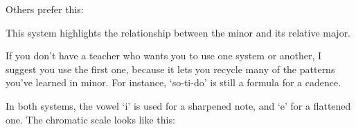 \documentclass{sight}
\begin{document}
\pagebreak[3]\par
\vspace{5mm}\begin{samepage}Others prefer this:\\


\pagebreak[3]\par
\par
{%
\parindent 0pt
\noindent
\ifx\preLilyPondExample \undefined
\else
  \expandafter\preLilyPondExample
\fi
\def\lilypondbook{}%

\ifx\postLilyPondExample \undefined
\else
  \expandafter\postLilyPondExample
\fi
}
\end{samepage}


\pagebreak[3]\par
\vspace{5mm}\begin{samepage}This system highlights the relationship between the minor and its relative major.\\
\end{samepage}


\pagebreak[3]\par
\vspace{5mm}\begin{samepage}If you don't have a teacher who wants you to use one system or another, I suggest you use the first one, because it lets you recycle many of the patterns you've learned in minor. For instance, `so-ti-do' is still a formula for a cadence.\\
\end{samepage}


\pagebreak[3]\par
\vspace{5mm}\begin{samepage}In both systems, the vowel `i' is used for a sharpened note, and `e' for a flattened one. The chromatic scale looks like this:\\


\pagebreak[3]\par
\par
{%
\parindent 0pt
\noindent
\ifx\preLilyPondExample \undefined
\else
  \expandafter\preLilyPondExample
\fi
\def\lilypondbook{}%

\ifx\postLilyPondExample \undefined
\else
  \expandafter\postLilyPondExample
\fi
}
\end{samepage}
\end{document}
